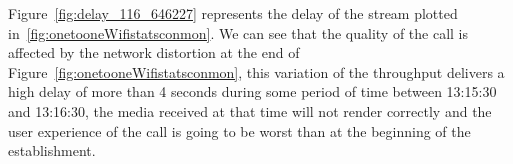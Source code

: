 Figure~\ref{fig:delay_116_646227} represents the delay of the stream plotted in~\ref{fig:onetooneWifistatsconmon}. We can see that the quality of the call is affected by the network distortion at the end of Figure~\ref{fig:onetooneWifistatsconmon}, this variation of the throughput delivers a high delay of more than 4 seconds during some period of time between 13:15:30 and 13:16:30, the media received at that time will not render correctly and the user experience of the call is going to be worst than at the beginning of the establishment.

